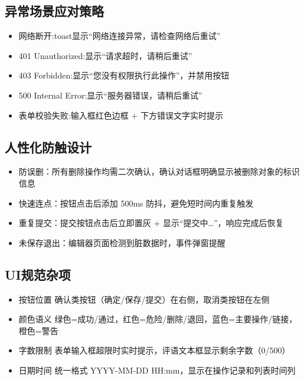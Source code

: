\documentclass{article}
\begin{document}
\subsection{异常场景应对策略}
\begin{itemize}
	\item 网络断开:toast显示“网络连接异常，请检查网络后重试”
	\item 401 Unauthorized:显示“请求超时，请稍后重试”
	\item 403 Forbidden:显示“您没有权限执行此操作”，并禁用按钮
	\item 500 Internal Error:显示“服务器错误，请稍后重试”
	\item 表单校验失败:输入框红色边框 + 下方错误文字实时提示
\end{itemize}
\subsection{人性化防触设计}
\begin{itemize}
	\item 防误删：所有删除操作均需二次确认，确认对话框明确显示被删除对象的标识信息
	\item 快速连点：按钮点击后添加 500ms 防抖，避免短时间内重复触发
	\item 重复提交：提交按钮点击后立即置灰 + 显示“提交中…”，响应完成后恢复
	\item 未保存退出：编辑器页面检测到脏数据时，事件弹窗提醒
\end{itemize}
\subsection{UI规范杂项}
\begin{itemize}
	\item 按钮位置	确认类按钮（确定/保存/提交）在右侧，取消类按钮在左侧
	\item 颜色语义	绿色=成功/通过，红色=危险/删除/退回，蓝色=主要操作/链接，橙色=警告
	\item 字数限制	表单输入框超限时实时提示，评语文本框显示剩余字数（0/500）
	\item 日期时间	统一格式 YYYY-MM-DD HH:mm，显示在操作记录和列表时间列
\end{itemize}
\end{document}

